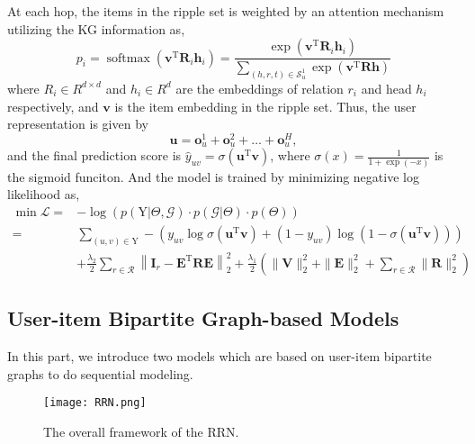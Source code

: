 At each hop, the items in the ripple set is weighted by an attention mechanism utilizing
the KG information as,
\begin{equation}
    p_{i}=\operatorname{softmax}\left(\mathbf{v}^{\mathrm{T}} \mathbf{R}_{i} \mathbf{h}_{i}\right)=\frac{\exp \left(\mathbf{v}^{\mathrm{T}} \mathbf{R}_{i} \mathbf{h}_{i}\right)}{\sum_{(h, r, t) \in \mathcal{S}_{u}^{1}} \exp \left(\mathbf{v}^{\mathrm{T}} \mathbf{R} \mathbf{h}\right)}
\end{equation}
where $R_i \in R^{d \times d}$ and $h_i \in R^d$ are the embeddings of relation
$r_i$ and head $h_i$ respectively, and $\mathbf{v}$ is the item embedding in the
ripple set.
Thus, the user representation is given by 
\begin{equation}
    \mathbf{u}=\mathbf{o}_{u}^{1}+\mathbf{o}_{u}^{2}+\ldots+\mathbf{o}_{u}^{H},    
\end{equation}
and the final prediction score is $\hat{y}_{u v}=\sigma\left(\mathbf{u}^{\mathrm{T}} \mathbf{v}\right)$,
where $\sigma(x)=\frac{1}{1+\exp (-x)}$ is the sigmoid funciton. And the model
is trained by minimizing negative log likelihood as, 
\begin{equation}
\begin{aligned} \min \mathcal{L}=&-\log (p(\mathrm{Y} | \Theta, \mathcal{G}) \cdot p(\mathcal{G} | \Theta) \cdot p(\Theta)) \\=& \sum_{(u, v) \in \mathrm{Y}}-\left(y_{u v} \log \sigma\left(\mathbf{u}^{\mathrm{T}} \mathbf{v}\right)+\left(1-y_{u v}\right) \log \left(1-\sigma\left(\mathbf{u}^{\mathrm{T}} \mathbf{v}\right)\right)\right) \\ &+\frac{\lambda_{2}}{2} \sum_{r \in \mathcal{R}}\left\|\mathbf{I}_{r}-\mathbf{E}^{\mathrm{T}} \mathbf{R E}\right\|_{2}^{2}+\frac{\lambda_{1}}{2}\left(\|\mathbf{V}\|_{2}^{2}+\|\mathbf{E}\|_{2}^{2}+\sum_{r \in \mathcal{R}}\|\mathbf{R}\|_{2}^{2}\right) \end{aligned}
\end{equation}

\subsection{User-item Bipartite Graph-based Models}
In this part, we introduce two models which are based on user-item bipartite
graphs to do sequential modeling. 

\begin{figure}[h]
	\centering
	\texttt{[image: RRN.png]}
	\caption{The overall framework of the RRN.}
	\label{fig:rrn}
	\vspace{-10pt}
\end{figure}

